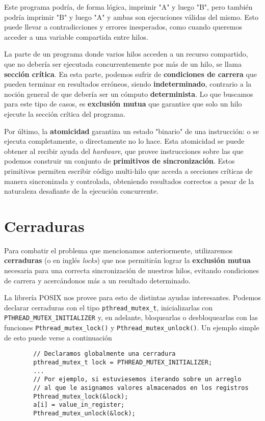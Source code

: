 \documentclass{article}
\begin{document}
	Este programa podría, de forma lógica, imprimir "A" y luego "B", pero también podría imprimir "B" y luego "A" y ambas son ejecuciones válidas del mismo. Esto puede llevar a contradicciones y errores inesperados, como cuando queremos acceder a una variable compartida entre hilos.
	
	La parte de un programa donde varios hilos acceden a un recurso compartido, que no debería ser ejecutada concurrentemente por más de un hilo, se llama \textbf{sección crítica}. En esta parte, podemos sufrir de \textbf{condiciones de carrera} que pueden terminar en resultados erróneos, siendo \textbf{indeterminado}, contrario a la noción general de que debería ser un cómputo \textbf{determinista}. Lo que buscamos para este tipo de casos, es \textbf{exclusión mutua} que garantice que solo un hilo ejecute la sección crítica del programa.
	
	Por último, la \textbf{atomicidad} garantiza un estado "binario" de una instrucción: o se ejecuta completamente, o directamente no lo hace. Esta atomicidad se puede obtener al recibir ayuda del \textit{hardware}, que provee instrucciones sobre las que podemos construir un conjunto de \textbf{primitivos de sincronización}. Estos primitivos permiten escribir código multi-hilo que acceda a secciones críticas de manera sincronizada y controlada, obteniendo resultados correctos a pesar de la naturaleza desafiante de la ejecución concurrente.
	
	\section{Cerraduras}
	
	Para combatir el problema que mencionamos anteriormente, utilizaremos \textbf{cerraduras} (o en inglés \textit{locks}) que nos permitirán lograr la \textbf{exclusión mutua}  necesaria para una correcta sincronización de nuestros hilos, evitando condiciones de carrera y acercándonos más a un resultado determinado.
	
	La librería POSIX nos provee para esto de distintas ayudas interesantes. Podemos declarar cerraduras con el tipo \lstinline|pthread_mutex_t|, inicializarlas con \lstinline|PTHREAD_MUTEX_INITIALIZER| y, en adelante, bloquearlas o desbloquearlas con las funciones \lstinline|Pthread_mutex_lock()| y \lstinline|Pthread_mutex_unlock()|. Un ejemplo simple de esto puede verse a continuación
	
	\begin{lstlisting}
		// Declaramos globalmente una cerradura
		pthread_mutex_t lock = PTHREAD_MUTEX_INITIALIZER;
		...
		// Por ejemplo, si estuviesemos iterando sobre un arreglo
		// al que le asignamos valores almacenados en los registros
		Pthread_mutex_lock(&lock);
		a[i] = value_in_register;
		Pthread_mutex_unlock(&lock);
	\end{lstlisting}
	
\end{document}
